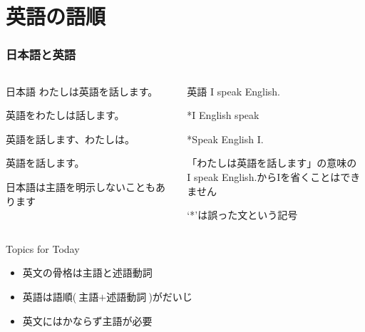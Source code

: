 \documentclass[aspectratio=169,xcolor={dvipsnames,table}]{beamer}
\begin{document}
\section{英語の語順}
\begin{frame}[plain]\frametitle{日本語と英語}

\begin{columns}
\begin{column}[t]{.45\textwidth}
\begin{block}{日本語}
わたしは英語を話します。\pause

英語をわたしは話します。\pause

英語を話します、わたしは。\pause

英語を話します。

\hfill{\scriptsize 日本語は主語を明示しないこともあります}
\end{block}
\end{column}
\pause
\begin{column}[t]{.45\textwidth}
\begin{alertblock}{英語}
I speak English.\pause

\mbox{}\hspace{75pt}*I English speak\pause

\mbox{}\hspace{75pt}*Speak English I.\pause

\bigskip

{\scriptsize 「わたしは英語を話します」の意味の\\[-5pt]I speak English.からIを省くことはできません}

\scriptsize
\mbox{}\hspace{75pt}%
`*'は誤った文という記号　
\end{alertblock}
\end{column}
\end{columns}


\bigskip
\pause
\begin{exampleblock}{Topics for Today}
\begin{itemize}[circle]
 \item   英文の骨格は主語と述語動詞
 \item   英語は語順($\text{主語}+\text{述語動詞}$)がだいじ
 \item   英文にはかならず主語が必要
\end{itemize}
     \end{exampleblock}
\end{frame}
\end{document}

